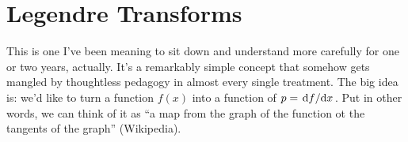 \documentclass{report}
\begin{document}

\section{Legendre Transforms}
This is one I've been meaning to sit down and understand more carefully for one
or two years, actually. It's a remarkably simple concept that somehow gets 
mangled by thoughtless pedagogy in almost every single treatment. 
The big idea is: we'd like to turn a function $ f(x) $ into a function of $
p = \dv*{f}{x} $. Put in other words, we can think of it as ``a map from the graph of 
the function ot the tangents of the graph'' (Wikipedia). 
\end{document}
